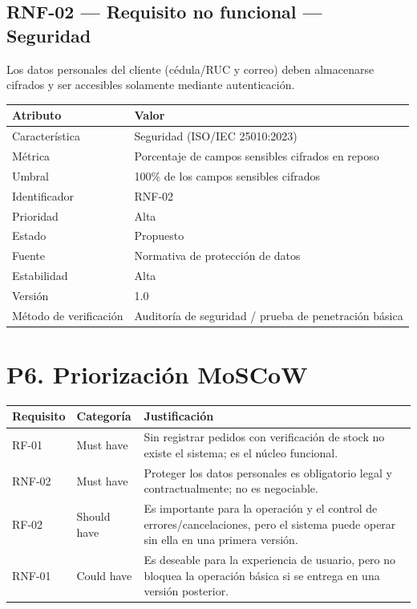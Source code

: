 \documentclass[12pt,a4paper]{article}
\begin{document}
\subsection{RNF-02 — Requisito no funcional — Seguridad}

Los datos personales del cliente (cédula/RUC y correo) deben almacenarse cifrados y ser accesibles solamente mediante autenticación.

\begin{longtable}{p{5cm}p{9cm}}
\toprule
\textbf{Atributo} & \textbf{Valor} \\
\midrule
Característica & Seguridad (ISO/IEC 25010:2023) \\
Métrica & Porcentaje de campos sensibles cifrados en reposo \\
Umbral & 100\% de los campos sensibles cifrados \\
Identificador & RNF-02 \\
Prioridad & Alta \\
Estado & Propuesto \\
Fuente & Normativa de protección de datos \\
Estabilidad & Alta \\
Versión & 1.0 \\
Método de verificación & Auditoría de seguridad / prueba de penetración básica \\
\bottomrule
\end{longtable}


\section{P6. Priorización MoSCoW}

\begin{longtable}{p{3cm}p{3cm}p{9cm}}
\toprule
\textbf{Requisito} & \textbf{Categoría} & \textbf{Justificación} \\
\midrule
RF-01 & Must have &
Sin registrar pedidos con verificación de stock no existe el sistema; es el núcleo funcional. \\

RNF-02 & Must have &
Proteger los datos personales es obligatorio legal y contractualmente; no es negociable. \\

RF-02 & Should have &
Es importante para la operación y el control de errores/cancelaciones, pero el sistema puede operar sin ella en una primera versión. \\

RNF-01 & Could have &
Es deseable para la experiencia de usuario, pero no bloquea la operación básica si se entrega en una versión posterior. \\

\bottomrule
\end{longtable}
\end{document}
